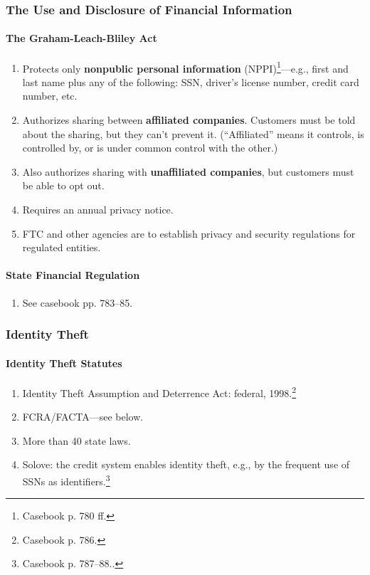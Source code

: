 \subsubsection{The Use and Disclosure of Financial Information}

\paragraph{The Graham-Leach-Bliley Act}

\begin{enumerate}
    \item Protects only \textbf{nonpublic personal information} 
    (NPPI)\footnote{Casebook p. 780 ff.}---e.g., first and last name plus any 
    of the following: SSN, driver's license number, credit card number, etc.
    \item Authorizes sharing between \textbf{affiliated companies}. Customers 
    must be told about the sharing, but they can't prevent it. (``Affiliated'' 
    means it controls, is controlled by, or is under common control with the 
    other.)
    \item Also authorizes sharing with \textbf{unaffiliated companies}, but 
    customers must be able to opt out.
    \item Requires an annual privacy notice.
    \item FTC and other agencies are to establish privacy and security 
    regulations for regulated entities.
\end{enumerate}

\paragraph{State Financial Regulation}

\begin{enumerate}
    \item See casebook pp. 783--85.
\end{enumerate}

\subsubsection{Identity Theft}

\paragraph{Identity Theft Statutes}

\begin{enumerate}
    \item Identity Theft Assumption and Deterrence Act: federal, 
    1998.\footnote{Casebook p. 786.}
    \item FCRA/FACTA---see below.
    \item More than 40 state laws.
    \item Solove: the credit system enables identity theft, e.g., by the 
    frequent use of SSNs as identifiers.\footnote{Casebook p. 787--88..}
\end{enumerate}


